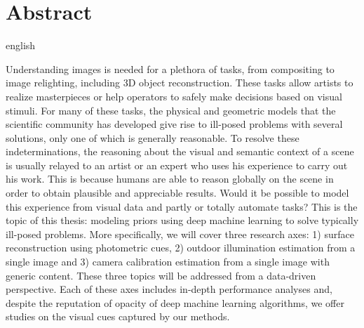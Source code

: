 \chapter*{Abstract}                      %

\begin{otherlanguage*}{english}

  Understanding images is needed for a plethora of tasks, from compositing to image relighting, including 3D object reconstruction. These tasks allow artists to realize masterpieces or help operators to safely make decisions based on visual stimuli. For many of these tasks, the physical and geometric models that the scientific community has developed give rise to ill-posed problems with several solutions, only one of which is generally reasonable. To resolve these indeterminations, the reasoning about the visual and semantic context of a scene is usually relayed to an artist or an expert who uses his experience to carry out his work. This is because humans are able to reason globally on the scene in order to obtain plausible and appreciable results. Would it be possible to model this experience from visual data and partly or totally automate tasks? This is the topic of this thesis: modeling priors using deep machine learning to solve typically ill-posed problems. More specifically, we will cover three research axes: 1) surface reconstruction using photometric cues, 2) outdoor illumination estimation from a single image and 3) camera calibration estimation from a single image with generic content. These three topics will be addressed from a data-driven perspective. Each of these axes includes in-depth performance analyses and, despite the reputation of opacity of deep machine learning algorithms, we offer studies on the visual cues captured by our methods. 

\end{otherlanguage*}
